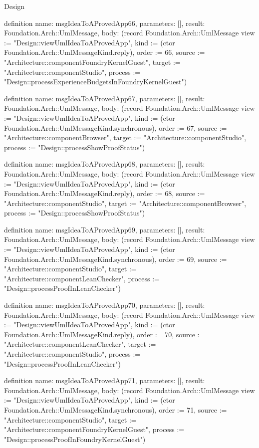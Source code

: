 \begin{lexlean}{Design}
\begin{semanticmodule}
definition{
  name: msgIdeaToAProvedApp66,
  parameters: [],
  result: Foundation.Arch::UmlMessage,
  body: (record Foundation.Arch::UmlMessage {view := "Design::viewUmlIdeaToAProvedApp", kind := (ctor Foundation.Arch::UmlMessageKind.reply), order := 66, source := "Architecture::componentFoundryKernelGuest", target := "Architecture::componentStudio", process := "Design::processExperienceBudgetsInFoundryKernelGuest"})
}

definition{
  name: msgIdeaToAProvedApp67,
  parameters: [],
  result: Foundation.Arch::UmlMessage,
  body: (record Foundation.Arch::UmlMessage {view := "Design::viewUmlIdeaToAProvedApp", kind := (ctor Foundation.Arch::UmlMessageKind.synchronous), order := 67, source := "Architecture::componentBrowser", target := "Architecture::componentStudio", process := "Design::processShowProofStatus"})
}

definition{
  name: msgIdeaToAProvedApp68,
  parameters: [],
  result: Foundation.Arch::UmlMessage,
  body: (record Foundation.Arch::UmlMessage {view := "Design::viewUmlIdeaToAProvedApp", kind := (ctor Foundation.Arch::UmlMessageKind.reply), order := 68, source := "Architecture::componentStudio", target := "Architecture::componentBrowser", process := "Design::processShowProofStatus"})
}

definition{
  name: msgIdeaToAProvedApp69,
  parameters: [],
  result: Foundation.Arch::UmlMessage,
  body: (record Foundation.Arch::UmlMessage {view := "Design::viewUmlIdeaToAProvedApp", kind := (ctor Foundation.Arch::UmlMessageKind.synchronous), order := 69, source := "Architecture::componentStudio", target := "Architecture::componentLeanChecker", process := "Design::processProofInLeanChecker"})
}

definition{
  name: msgIdeaToAProvedApp70,
  parameters: [],
  result: Foundation.Arch::UmlMessage,
  body: (record Foundation.Arch::UmlMessage {view := "Design::viewUmlIdeaToAProvedApp", kind := (ctor Foundation.Arch::UmlMessageKind.reply), order := 70, source := "Architecture::componentLeanChecker", target := "Architecture::componentStudio", process := "Design::processProofInLeanChecker"})
}

definition{
  name: msgIdeaToAProvedApp71,
  parameters: [],
  result: Foundation.Arch::UmlMessage,
  body: (record Foundation.Arch::UmlMessage {view := "Design::viewUmlIdeaToAProvedApp", kind := (ctor Foundation.Arch::UmlMessageKind.synchronous), order := 71, source := "Architecture::componentStudio", target := "Architecture::componentFoundryKernelGuest", process := "Design::processProofInFoundryKernelGuest"})
}


\end{semanticmodule}
\end{lexlean}
